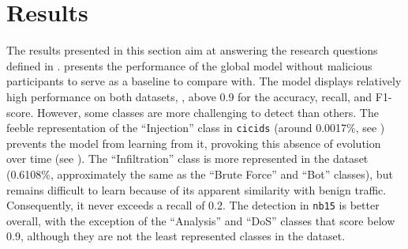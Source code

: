 \section{Results\label{sec:assess.results}}

The results presented in this section aim at answering the research questions defined in .
 presents the performance of the global model without malicious participants to serve as a baseline to compare with.
The model displays relatively high performance on both datasets, \ie, above 0.9 for the accuracy, recall, and F1-score.
However, some classes are more challenging to detect than others.
The feeble representation of the ``Injection'' class in \texttt{cicids} (around 0.0017\%, see ) prevents the model from learning from it, provoking this absence of evolution over time (see ).
The ``Infiltration'' class is more represented in the dataset (0.6108\%, approximately the same as the ``Brute Force'' and ``Bot'' classes), but remains difficult to learn because of its apparent similarity with benign traffic.
Consequently, it never exceeds a recall of 0.2.
The detection in \texttt{nb15} is better overall, with the exception of the ``Analysis'' and ``DoS'' classes that score below 0.9, although they are not the least represented classes in the dataset.

